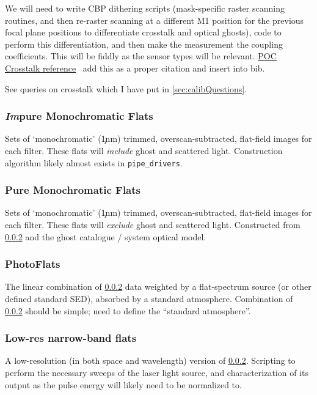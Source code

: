 We will need to write CBP dithering scripts (mask-specific raster scanning routines, and then re-raster scanning at a different M1 position for the previous focal plane positions to differentiate crosstalk and optical ghosts), code to perform this differentiation, and then make the measurement the coupling coefficients. This will be fiddly as the sensor types will be relevant. \hyperref{http://iopscience.iop.org/article/10.1088/1748-0221/10/05/C05010}{}{}{POC Crosstalk reference} \xxx\ add this as a proper citation and insert into bib.
\begin{note}
	See queries on crosstalk which I have put in \secsymbol\ref{sec:calibQuestions}.
\end{note}


\subsubsection{\emph{Im}pure Monochromatic Flats}\label{calibProducts:monoFlat}
Sets of `monochromatic' (\c 1nm) trimmed, overscan-subtracted, flat-field images for each filter.  These flats will \textit{include} ghost and scattered light.
\alg Construction algorithm likely almost exists in \texttt{pipe\_drivers}.


\subsubsection{Pure Monochromatic Flats}\label{calibProducts:monoPhotoFlat}
Sets of `monochromatic' (\c 1nm) trimmed, overscan-subtracted, flat-field images for each filter.  These flats will \textit{exclude} ghost and scattered light.
\alg Constructed from \ref{calibProducts:monoPhotoFlat} and the ghost catalogue / system optical model.


\subsubsection{PhotoFlats}\label{calibProducts:standardPhotoFlat}
The linear combination of \ref{calibProducts:monoPhotoFlat} data weighted by a flat-spectrum source (or other defined standard SED), absorbed by a standard atmosphere.
\alg Combination of \ref{calibProducts:monoPhotoFlat} should be simple; need to define the ``standard atmosphere''.


\subsubsection{Low-res narrow-band flats}\label{calibProducts:monoPhotoFlatLowRes}
A low-resolution (in both space and wavelength) version of  \ref{calibProducts:monoPhotoFlat}.
\alg Scripting to perform the necessary sweeps of the laser light source, and characterization of its output as the pulse energy will likely need to be normalized to. 


